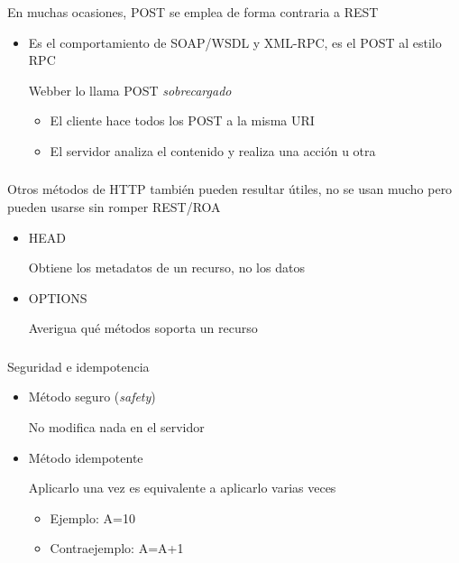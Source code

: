 \documentclass[ucs]{beamer}
\begin{document}
\begin{frame}[fragile]
\frametitle{}
En muchas ocasiones, POST se emplea de forma contraria a REST
\begin{itemize}
\item
Es el comportamiento de SOAP/WSDL y XML-RPC, es el POST al estilo RPC

Webber lo llama POST \emph{sobrecargado}


\begin{itemize}
\item
El cliente hace todos los POST a la misma URI
\item
El servidor analiza el contenido y realiza una acción u otra
\end{itemize}
\end{itemize}

\end{frame}


\begin{frame}[fragile]
\frametitle{}
Otros métodos de HTTP también pueden resultar útiles, no se
usan mucho pero pueden usarse sin romper REST/ROA
\begin{itemize}
\item
HEAD   

Obtiene los metadatos de un recurso, no los datos
\item
OPTIONS  

Averigua qué métodos soporta un recurso
\end{itemize}

\end{frame}



\begin{frame}[fragile]
\frametitle{}

Seguridad e idempotencia
\begin{itemize}
\item
Método seguro (\emph{safety})

No modifica nada en el servidor
\item
Método idempotente

Aplicarlo una vez es equivalente a aplicarlo varias veces

\begin{itemize}
\item
Ejemplo: A=10
\item
Contraejemplo: A=A+1
\end{itemize}

\end{itemize}

\end{frame}
\end{document}
